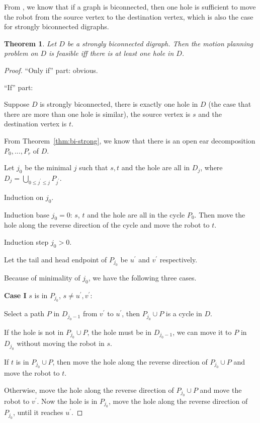 \documentclass{article}
\newtheorem{thm}{Theorem}
\begin{document}
\smallskip
From \cite{PapadimitriouRST94}, we know that if a graph is
biconnected, then one hole is sufficient to move the robot from the
source vertex to the destination vertex, which is also the case for
strongly biconnected digraphs.
\begin{thm}\label{thm:feas-bi-strong}
Let $D$ be a strongly biconnected digraph. Then the motion planning
problem on $D$ is feasible iff there is at least one hole in $D$.
\end{thm}
\begin{proof}

``Only if'' part: obvious.

``If'' part:

Suppose $D$ is strongly biconnected, there is exactly one hole in
$D$ (the case that there are more than one hole is similar), the
source vertex is $s$ and the destination vertex is $t$.

From Theorem~\ref{thm:bi-strong}, we know that there is an open ear
decomposition $P_0,...,P_r$ of $D$.

Let $j_0$ be the minimal $j$ such that $s, t$ and the hole are all
in $D_j$, where $D_j=\bigcup \limits_{0 \le j^\prime \le j}
P_{j^\prime}$.

Induction on $j_0$.

Induction base $j_0=0$: $s$, $t$ and the hole are all in the cycle
$P_0$. Then move the hole along the reverse direction of the cycle
and move the robot to $t$.

Induction step $j_0 > 0$.

Let the tail and head endpoint of $P_{j_0}$ be $u^\prime$ and
$v^\prime$ respectively.

Because of minimality of $j_0$, we have the following three cases.

\textbf{Case I} $s$ is in $P_{j_0}$, $s \neq u^\prime, v^\prime$:

Select a path $P$ in $D_{j_0-1}$ from $v^\prime$ to $u^\prime$, then
$P_{j_0} \cup P$ is a cycle in $D$.

If the hole is not in $P_{j_0} \cup P$, the hole must be in
$D_{j_0-1}$, we can move it to $P$ in $D_{j_0}$ without moving the
robot in $s$.

If $t$ is in $P_{j_0} \cup P$, then move the hole along the reverse
direction of $P_{j_0} \cup P$ and move the robot to $t$.

Otherwise, move the hole along the reverse direction of $P_{j_0}
\cup P$ and move the robot to $v^\prime$. Now the hole is in
$P_{j_0}$, move the hole along the reverse direction of $P_{j_0}$,
until it reaches $u^\prime$.


\end{proof}
\end{document}
